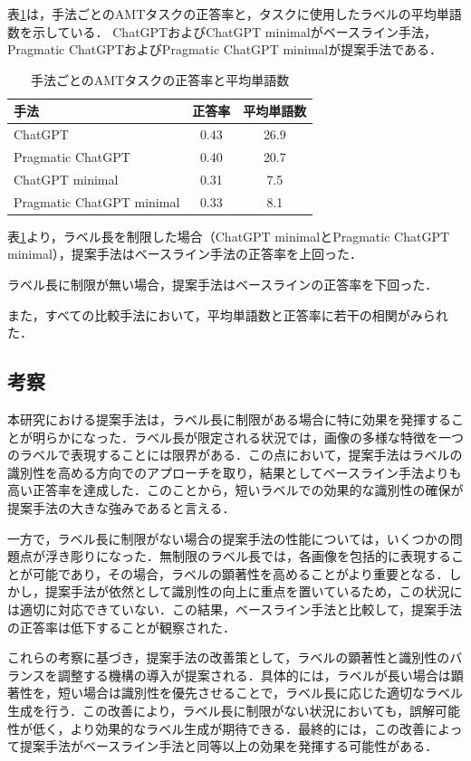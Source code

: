 \documentclass[a4paper,11pt]{jreport}
\begin{document}
表\ref{tab:accuracy_result}は，手法ごとのAMTタスクの正答率と，タスクに使用したラベルの平均単語数を示している．
ChatGPTおよびChatGPT minimalがベースライン手法，Pragmatic ChatGPTおよびPragmatic ChatGPT minimalが提案手法である．

\begin{table}[H]
\centering
\begin{tabular}{lcc}
\hline
手法 & 正答率 & 平均単語数 \\
\hline
ChatGPT & 0.43 & 26.9 \\
Pragmatic ChatGPT & 0.40 & 20.7 \\
ChatGPT minimal & 0.31 & 7.5 \\
Pragmatic ChatGPT minimal & 0.33 & 8.1 \\
\hline
\end{tabular}
\caption{手法ごとのAMTタスクの正答率と平均単語数}
\label{tab:accuracy_result}
\end{table}

表\ref{tab:accuracy_result}より，ラベル長を制限した場合（ChatGPT minimalとPragmatic ChatGPT minimal），提案手法はベースライン手法の正答率を上回った．

ラベル長に制限が無い場合，提案手法はベースラインの正答率を下回った．

また，すべての比較手法において，平均単語数と正答率に若干の相関がみられた．

\subsection{考察}
本研究における提案手法は，ラベル長に制限がある場合に特に効果を発揮することが明らかになった．ラベル長が限定される状況では，画像の多様な特徴を一つのラベルで表現することには限界がある．この点において，提案手法はラベルの識別性を高める方向でのアプローチを取り，結果としてベースライン手法よりも高い正答率を達成した．このことから，短いラベルでの効果的な識別性の確保が提案手法の大きな強みであると言える．

一方で，ラベル長に制限がない場合の提案手法の性能については，いくつかの問題点が浮き彫りになった．無制限のラベル長では，各画像を包括的に表現することが可能であり，その場合，ラベルの顕著性を高めることがより重要となる．しかし，提案手法が依然として識別性の向上に重点を置いているため，この状況には適切に対応できていない．この結果，ベースライン手法と比較して，提案手法の正答率は低下することが観察された．

これらの考察に基づき，提案手法の改善策として，ラベルの顕著性と識別性のバランスを調整する機構の導入が提案される．具体的には，ラベルが長い場合は顕著性を，短い場合は識別性を優先させることで，ラベル長に応じた適切なラベル生成を行う．この改善により，ラベル長に制限がない状況においても，誤解可能性が低く，より効果的なラベル生成が期待できる．最終的には，この改善によって提案手法がベースライン手法と同等以上の効果を発揮する可能性がある．
\end{document}
